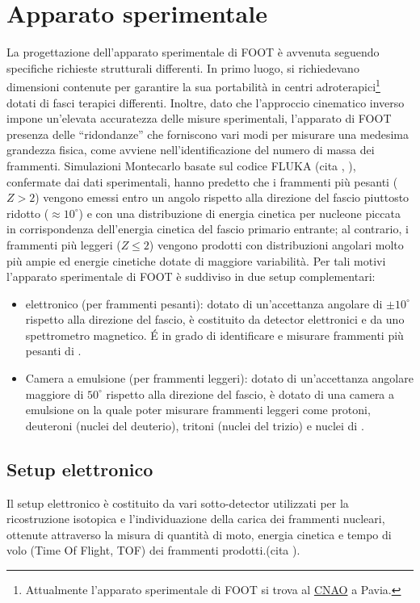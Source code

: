 \documentclass[12pt,a4paper,twoside]{report}
\begin{document}
	\section{Apparato sperimentale}
	La progettazione dell'apparato sperimentale di FOOT è avvenuta seguendo specifiche richieste strutturali differenti. In primo luogo, si richiedevano dimensioni contenute per garantire la sua portabilità in centri adroterapici\footnote{Attualmente l'apparato sperimentale di FOOT si trova al \hyperref[sec:adroterapia_italia]{CNAO} a Pavia.} dotati di fasci terapici differenti. Inoltre, dato che l'approccio cinematico inverso impone un'elevata accuratezza delle misure sperimentali, l'apparato di FOOT presenza delle ``ridondanze'' che forniscono vari modi per misurare una medesima grandezza fisica, come avviene nell'identificazione del numero di massa dei frammenti. Simulazioni Montecarlo basate sul codice FLUKA (cita
	,
	), confermate dai dati sperimentali, hanno predetto che i frammenti più pesanti ($Z>2$) vengono emessi entro un angolo rispetto alla direzione del fascio piuttosto ridotto ($\approx10^\circ$) e con una distribuzione di energia cinetica per nucleone piccata in corrispondenza dell'energia cinetica del fascio primario entrante; al contrario, i frammenti più leggeri ($Z\le2$) vengono prodotti con distribuzioni angolari molto più ampie ed energie cinetiche dotate di maggiore variabilità. Per tali motivi l'apparato sperimentale di FOOT è suddiviso in due setup complementari:
	\begin{itemize}
		\item elettronico (per frammenti pesanti): dotato di un'accettanza angolare di $\pm10^\circ$ rispetto alla direzione del fascio, è costituito da detector elettronici e da uno spettrometro magnetico. \'E in grado di identificare e misurare frammenti più pesanti di .
		\item Camera a emulsione (per frammenti leggeri): dotato di un'accettanza angolare maggiore di $50^\circ$ rispetto alla direzione del fascio, è dotato di una camera a emulsione on la quale poter misurare frammenti leggeri come protoni, deuteroni (nuclei del deuterio), tritoni (nuclei del trizio) e nuclei di .
	\end{itemize}
	
	\subsection{Setup elettronico}
	Il setup elettronico è costituito da vari sotto-detector utilizzati per la ricostruzione isotopica e l'individuazione della carica dei frammenti nucleari, ottenute attraverso la misura di quantità di moto, energia cinetica e tempo di volo (Time Of Flight, TOF) dei frammenti prodotti.(cita
	).
	
\end{document}
